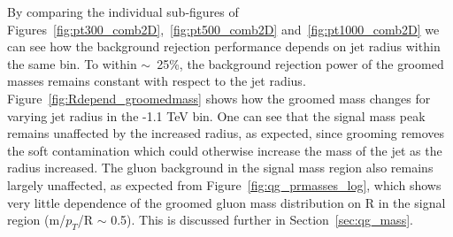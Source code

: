 By comparing the individual sub-figures of Figures~\ref{fig:pt300_comb2D},~\ref{fig:pt500_comb2D}
and~\ref{fig:pt1000_comb2D} we can see how the background rejection
performance depends on jet radius within the same \pt bin. To within
$\sim$~25\%, the background rejection power of the groomed masses remains
constant with respect to the jet
radius. Figure~\ref{fig:Rdepend_groomedmass} shows how the groomed
mass changes for varying jet radius in the -1.1 TeV bin. One
can see that the signal mass peak remains unaffected by the increased
radius, as expected, since grooming removes the soft contamination
which could otherwise increase the mass of the jet as the radius
increased. The gluon background in the signal mass region also remains
largely unaffected, as expected from Figure~\ref{fig:qg_prmasses_log},
which shows very little dependence of the groomed gluon mass
distribution on R in the signal region (m/$p_{T}$/R $\sim$ 0.5). This is
discussed further in Section~\ref{sec:qg_mass}.

